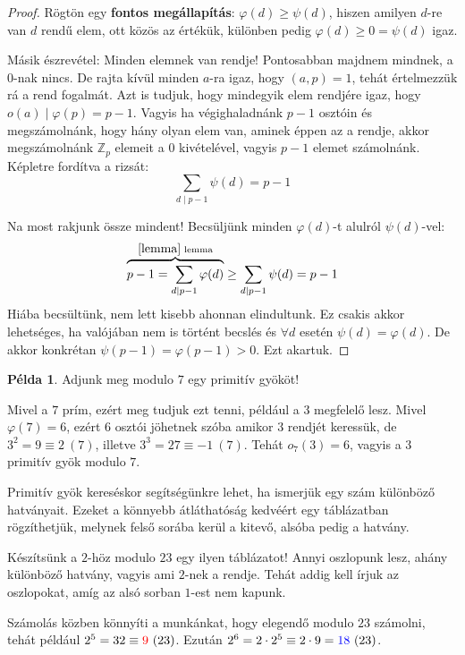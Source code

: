 \documentclass[12pt]{book}
\theoremstyle{plain} %
\theoremstyle{definition} %
\newtheorem{pl}{Példa}[section]
\theoremstyle{remark}
\numberwithin{equation}{section}  %
\begin{document}
\begin{proof}
		Rögtön egy \textbf{fontos megállapítás}: $\varphi(d)\geq \psi(d)$, hiszen amilyen $d$-re van $d$ rendű elem, ott közös az értékük, különben pedig $\varphi(d)\geq 0 = \psi(d)$ igaz.
		
		Másik észrevétel: Minden elemnek van rendje! Pontosabban majdnem mindnek, a $0$-nak nincs. De rajta kívül minden $a$-ra igaz, hogy $(a,p)=1$, tehát értelmezzük rá a rend fogalmát. Azt is tudjuk, hogy mindegyik elem rendjére igaz, hogy $o(a)\mid \varphi(p) = p-1$. Vagyis ha végighaladnánk $p-1$ osztóin és megszámolnánk, hogy hány olyan elem van, aminek éppen az a rendje, akkor megszámolnánk $\mathbb{Z}_p$ elemeit a $0$ kivételével, vagyis $p-1$ elemet számolnánk. Képletre fordítva a rizsát:
		\[ \displaystyle \sum_{d\mid p-1} \psi(d) = p-1  \]
		
		Na most rakjunk össze mindent! Becsüljünk minden $\varphi(d)$-t alulról $\psi(d)$-vel:
		\[ \overbrace{p-1 = \displaystyle \sum_{d\mid p-1} \varphi(d)}^{\ref{lemma}\text{ lemma}} \geq \displaystyle \sum_{d\mid p-1} \psi(d) = p-1  \]
		Hiába becsültünk, nem lett kisebb ahonnan elindultunk. Ez csakis akkor lehetséges, ha valójában nem is történt becslés és $\forall d$ esetén $\psi(d)=\varphi(d)$. De akkor konkrétan $\psi(p-1) = \varphi(p-1)>0$. Ezt akartuk.
	\end{proof}
	
	\begin{pl}
		Adjunk meg modulo $7$ egy primitív gyököt!
		
		Mivel a $7$ prím, ezért meg tudjuk ezt tenni, például a $3$ megfelelő lesz. Mivel $\varphi(7)=6$, ezért $6$ osztói jöhetnek szóba amikor $3$ rendjét keressük, de $3^2=9\equiv 2 \ (7)$, illetve $3^3 = 27 \equiv -1 \ (7)$. Tehát $o_7(3)=6$, vagyis a $3$ primitív gyök modulo $7$.
	\end{pl}

	Primitív gyök kereséskor segítségünkre lehet, ha ismerjük egy szám különböző hatványait. Ezeket a könnyebb átláthatóság kedvéért egy táblázatban rögzíthetjük, melynek felső sorába kerül a kitevő, alsóba pedig a hatvány.
	
	Készítsünk a $2$-höz modulo $23$ egy ilyen táblázatot! Annyi oszlopunk lesz, ahány különböző hatvány, vagyis ami $2$-nek a rendje. Tehát addig kell írjuk az oszlopokat, amíg az alsó sorban $1$-est nem kapunk.
	
	Számolás közben könnyíti a munkánkat, hogy elegendő modulo $23$ számolni, tehát például $2^5=32 \equiv \color{red}9\color{black}\ (23)$. Ezután $2^6=2\cdot 2^5 \equiv 2\cdot 9 = \color{blue}18\color{black}\ (23)$.
	
\end{document}
